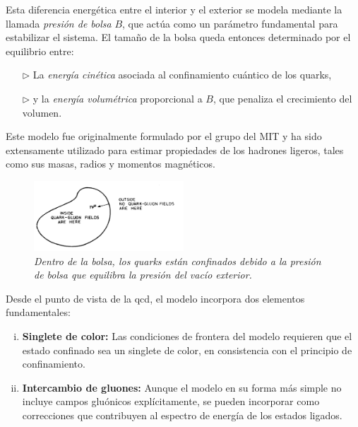 Esta diferencia energética entre el interior y el exterior se modela mediante la llamada \emph{presión de bolsa} \( B \), que actúa como un parámetro fundamental para estabilizar el sistema. El tamaño de la bolsa queda entonces determinado por el equilibrio entre:

\begin{enumerate}
    \item[$\triangleright$] La \emph{energía cinética} asociada al confinamiento cuántico de los quarks,
    \item[$\triangleright$] y la \emph{energía volumétrica} proporcional a \( B \), que penaliza el crecimiento del volumen.
\end{enumerate}

Este modelo fue originalmente formulado por el grupo del MIT \cite{Chodos_1974} y ha sido extensamente utilizado para estimar propiedades de los hadrones ligeros, tales como sus masas, radios y momentos magnéticos.

\begin{figure}
    \centering
    \includegraphics[width=0.5\textwidth]{./Images/Bag model BC.png}
    \caption[Modelo de bolsa con condiciones de frontera]{\emph{Dentro de la bolsa, los quarks están confinados debido a la presión de bolsa que equilibra la presión del vacío exterior.}}
    \label{fig: Bolsa BC}
\end{figure}

Desde el punto de vista de la \gls{qcd}, el modelo incorpora dos elementos fundamentales:

\begin{enumerate}[i.]
    \item \textbf{Singlete de color:} Las condiciones de frontera del modelo requieren que el estado confinado sea un singlete de color, en consistencia con el principio de confinamiento.
    \item \textbf{Intercambio de gluones:} Aunque el modelo en su forma más simple no incluye campos gluónicos explícitamente, se pueden incorporar como correcciones que contribuyen al espectro de energía de los estados ligados.
\end{enumerate}


